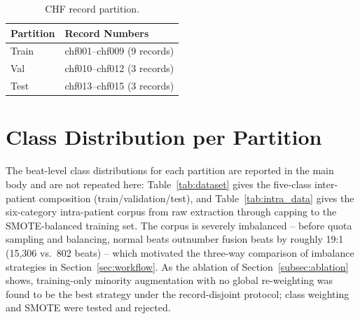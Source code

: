 \begin{table}[!t]
\centering
\caption{CHF record partition.}
\label{tab:chf_partition}
\begin{tabular}{@{}ll@{}}
\toprule
\textbf{Partition} & \textbf{Record Numbers} \\
\midrule
Train  & chf001--chf009 (9 records)   \\
Val    & chf010--chf012 (3 records)   \\
Test   & chf013--chf015 (3 records)   \\
\bottomrule
\end{tabular}
\end{table}


\section{Class Distribution per Partition}
\label{app:class_dist}

The beat-level class distributions for each partition are reported in the
main body and are not repeated here: Table~\ref{tab:dataset} gives the
five-class inter-patient composition (train/validation/test), and
Table~\ref{tab:intra_data} gives the six-category intra-patient corpus from
raw extraction through capping to the SMOTE-balanced training set. The
corpus is severely imbalanced -- before quota sampling and balancing,
normal beats outnumber fusion beats by roughly 19:1 (15{,}306 vs.~802
beats) -- which motivated the three-way comparison of imbalance strategies
in Section~\ref{sec:workflow}. As the ablation of
Section~\ref{subsec:ablation} shows, training-only minority augmentation
with no global re-weighting was found to be the best strategy under the
record-disjoint protocol; class weighting and SMOTE were tested and
rejected.

